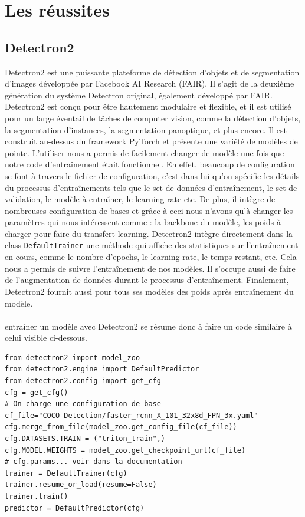 \section{Les réussites}

\subsection{Detectron2}
Detectron2 est une puissante plateforme de détection d'objets et de segmentation d'images développée par Facebook AI Research (FAIR). Il s'agit de la deuxième génération du système Detectron original, également développé par FAIR. Detectron2 est conçu pour être hautement modulaire et flexible, et il est utilisé pour un large éventail de tâches de computer vision, comme la détection d'objets, la segmentation d'instances, la segmentation panoptique, et plus encore. Il est construit au-dessus du framework PyTorch et présente une variété de modèles de pointe. L'utiliser nous a permis de facilement changer de modèle une fois que notre code d'entraînement était fonctionnel.
En effet, beaucoup de configuration se font à travers le fichier de configuration, c'est dans lui qu'on spécifie les détails du processus d'entraînements tels que le set de données d'entraînement, le set de validation, le modèle à entraîner, le learning-rate etc. De plus, il intègre de nombreuses configuration de bases et grâce à ceci nous n'avons qu'à changer les paramètres qui nous intéressent comme : la backbone du modèle, les poids à charger pour faire du transfert learning. Detectron2 intègre directement dans la class \verb|DefaultTrainer| une méthode qui affiche des statistiques sur l'entraînement en cours, comme le nombre d'epochs, le learning-rate, le temps restant, etc. Cela nous a permis de suivre l'entraînement de nos modèles. Il s'occupe aussi de faire de l'augmentation de données durant le processus d'entraînement. Finalement, Detectron2 fournit aussi pour tous ses modèles des poids après entraînement du modèle.
\paragraph{}
entraîner un modèle avec Detectron2 se résume donc à faire un code similaire à celui visible ci-dessous.
\lstset{style=Python}
\begin{lstlisting}
from detectron2 import model_zoo
from detectron2.engine import DefaultPredictor
from detectron2.config import get_cfg
cfg = get_cfg()
# On charge une configuration de base
cf_file="COCO-Detection/faster_rcnn_X_101_32x8d_FPN_3x.yaml"
cfg.merge_from_file(model_zoo.get_config_file(cf_file))
cfg.DATASETS.TRAIN = ("triton_train",)
cfg.MODEL.WEIGHTS = model_zoo.get_checkpoint_url(cf_file)  
# cfg.params... voir dans la documentation
trainer = DefaultTrainer(cfg) 
trainer.resume_or_load(resume=False)
trainer.train()
predictor = DefaultPredictor(cfg)
\end{lstlisting}
